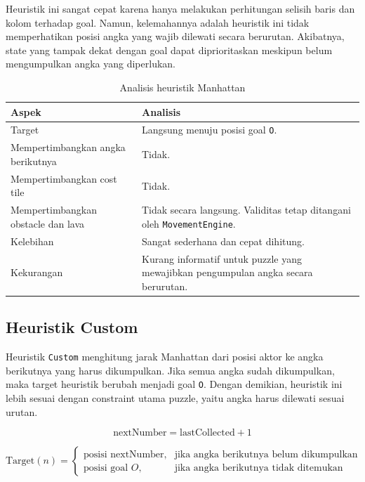 Heuristik ini sangat cepat karena hanya melakukan perhitungan selisih baris dan kolom terhadap goal. 
Namun, kelemahannya adalah heuristik ini tidak memperhatikan posisi angka yang wajib dilewati secara berurutan. 
Akibatnya, state yang tampak dekat dengan goal dapat diprioritaskan meskipun belum mengumpulkan angka yang diperlukan.

\begin{table}[H]
	\centering
	\caption{Analisis heuristik Manhattan}
	\begin{tabular}{|p{4cm}|p{10cm}|}
		\hline
		\rowcolor{orange!20}
		\textbf{Aspek} & \textbf{Analisis} \\
		\hline
		Target & Langsung menuju posisi goal \texttt{O}. \\
		\hline
		Mempertimbangkan angka berikutnya & Tidak. \\
		\hline
		Mempertimbangkan cost tile & Tidak. \\
		\hline
		Mempertimbangkan obstacle dan lava & Tidak secara langsung. Validitas tetap ditangani oleh \texttt{MovementEngine}. \\
		\hline
		Kelebihan & Sangat sederhana dan cepat dihitung. \\
		\hline
		Kekurangan & Kurang informatif untuk puzzle yang mewajibkan pengumpulan angka secara berurutan. \\
		\hline
	\end{tabular}
\end{table}

\subsection{Heuristik Custom}

Heuristik \texttt{Custom} menghitung jarak Manhattan dari posisi aktor ke angka berikutnya yang harus dikumpulkan. 
Jika semua angka sudah dikumpulkan, maka target heuristik berubah menjadi goal \texttt{O}. 
Dengan demikian, heuristik ini lebih sesuai dengan constraint utama puzzle, yaitu angka harus dilewati sesuai urutan.

\[
	\text{nextNumber} = \text{lastCollected} + 1
\]

\[
	\text{Target}(n)=
	\begin{cases}
		\text{posisi } \text{nextNumber}, & \text{jika angka berikutnya belum dikumpulkan} \\
		\text{posisi goal } O, & \text{jika angka berikutnya tidak ditemukan}
	\end{cases}
\]

